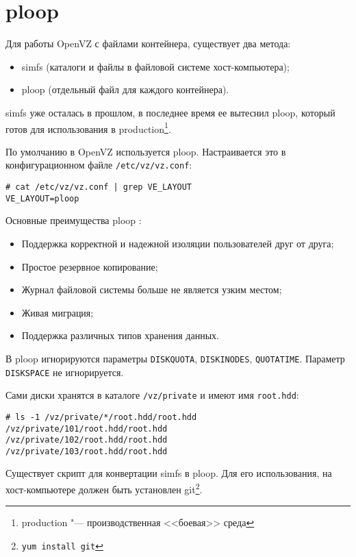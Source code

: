 \section{ploop}

Для работы OpenVZ с файлами контейнера, существует два метода:
\begin{itemize}
    \item simfs (каталоги и файлы в файловой системе хост-компьютера);
    \item ploop (отдельный файл для каждого контейнера).
\end{itemize}

simfs уже осталась в прошлом, в последнее время ее вытеснил ploop, который готов для использования в production\footnote{production "--- производственная <<боевая>> среда}.

По умолчанию в OpenVZ используется ploop.
Настраивается это в конфигурационном файле \texttt{/etc/vz/vz.conf}:
\begin{lstlisting}
# cat /etc/vz/vz.conf | grep VE_LAYOUT
VE_LAYOUT=ploop
\end{lstlisting}

Основные преимущества ploop \cite{ploop}:
\begin{itemize}
    \item Поддержка корректной и надежной изоляции пользователей друг от друга;
    \item Простое резервное копирование;
    \item Журнал файловой системы больше не является узким местом;
    \item Живая миграция;
    \item Поддержка различных типов хранения данных.
\end{itemize}

В ploop игнорируются параметры \texttt{DISKQUOTA}, \texttt{DISKINODES}, \texttt{QUOTATIME}.
Параметр \texttt{DISKSPACE} не игнорируется.

Сами диски хранятся в каталоге \texttt{/vz/private} и имеют имя \texttt{root.hdd}:
\begin{lstlisting}
# ls -1 /vz/private/*/root.hdd/root.hdd
/vz/private/101/root.hdd/root.hdd
/vz/private/102/root.hdd/root.hdd
/vz/private/103/root.hdd/root.hdd
\end{lstlisting}

\iffalse
Существует скрипт для конвертации simfs в ploop. 
Для его использования, на хост-компьютере должен быть установлен git\footnote{\texttt{yum install git}}.

